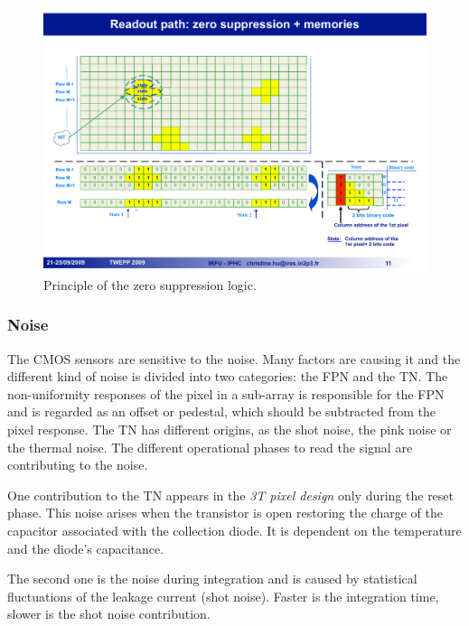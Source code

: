     \begin{figure}[!h]
      \centering
      \includegraphics[width=\textwidth]{Pictures/vxd/suze_hit.pdf}
      \caption{Principle of the zero suppression logic. }
      \label{fig:SUZE}
    \end{figure}

    \subsubsection{Noise}

    The \gls{CMOS} sensors are sensitive to the noise.
    Many factors are causing it and the different kind of noise is divided into two categories: the \gls{FPN} and the \gls{TN}.
    The non-uniformity responses of the pixel in a sub-array is responsible for the \gls{FPN} and is regarded as an offset or pedestal, which should be subtracted from the pixel response.
    The \gls{TN} has different origins, as the shot noise, the pink noise or the thermal noise.
    The different operational phases to read the signal are contributing to the noise.
    
    One contribution to the \gls{TN} appears in the \textit{3T pixel design} only during the reset phase.
    This noise arises when the transistor is open restoring the charge of the capacitor associated with the collection diode.
    It is dependent on the temperature and the diode's capacitance.
    
    The second one is the noise during integration and is caused by statistical fluctuations of the leakage current (shot noise).
    Faster is the integration time, slower is the shot noise contribution.
    
